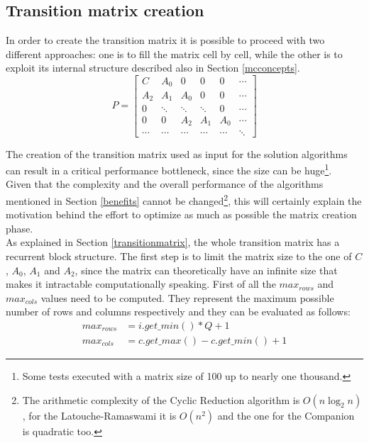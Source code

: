 \subsection{Transition matrix creation} \label{matrixcreation}
In order to create the transition matrix it is possible to proceed with two different approaches: one is to fill the matrix cell by cell, while the other is to exploit its internal structure described also in Section \ref{mcconcepts}.
\begin{equation*}
  P = 
  \begin{bmatrix}
    C & A_{0} & 0 & 0 & 0 & \cdots \\
    A_{2} & A_{1} & A_{0} & 0 & 0 & \cdots \\
    0 & \ddots & \ddots & \ddots & 0 & \cdots \\
    0 & 0 & A_{2} & A_{1} & A_{0} & \cdots \\
    \cdots & \cdots & \cdots & \cdots & \cdots & \ddots
  \end{bmatrix}
\end{equation*}

The creation of the transition matrix used as input for the solution algorithms can result in a critical performance bottleneck, since the size can be huge\footnote{Some tests executed with a matrix size of 100 up to nearly one thousand.}.\\ 
Given that the complexity and the overall performance of the algorithms mentioned in Section \ref{benefits} cannot be changed\footnote{The arithmetic complexity of the Cyclic Reduction algorithm is \( O(n\log_2n) \), for the Latouche-Ramaswami it is \( O(n^{2}) \) and the one for the Companion is quadratic too.}, this will certainly explain the motivation behind the effort to optimize as much as possible the matrix creation phase.\\
As explained in Section \ref{transitionmatrix}, the whole transition matrix has a recurrent block structure. The first step is to limit the matrix size to the one of \( C \), \( A_{0} \), \( A_{1} \) and \( A_{2} \), since the matrix can theoretically have an infinite size that makes it intractable computationally speaking. First of all the \( max_{rows} \) and \( max_{cols} \) values need to be computed. They represent the maximum possible number of rows and columns respectively and they can be evaluated as follows: 
\begin{equation*}
\begin{split}
  max_{rows} &= i.get\_min() * Q + 1 \\
  max_{cols} &= c.get\_max() - c.get\_min() + 1
\end{split}
\end{equation*}

